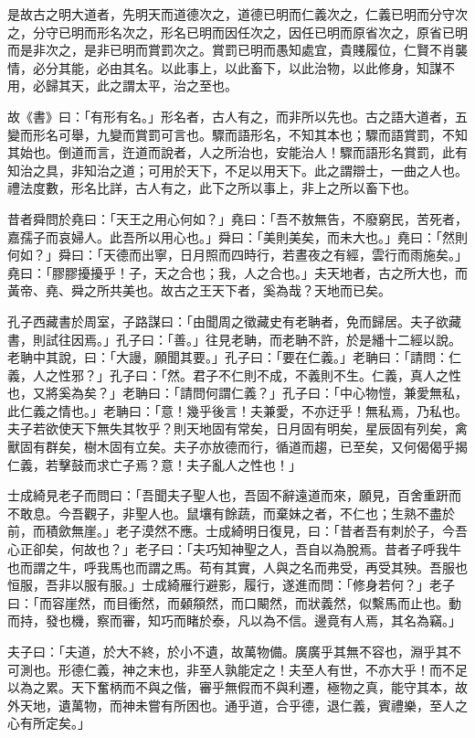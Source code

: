 \begin{pinyinscope}
是故古之明大道者，先明天而道德次之，道德已明而仁義次之，仁義已明而分守次之，分守已明而形名次之，形名已明而因任次之，因任已明而原省次之，原省已明而是非次之，是非已明而賞罰次之。賞罰已明而愚知處宜，貴賤履位，仁賢不肖襲情，必分其能，必由其名。以此事上，以此畜下，以此治物，以此修身，知謀不用，必歸其天，此之謂太平，治之至也。

故《書》曰：「有形有名。」形名者，古人有之，而非所以先也。古之語大道者，五變而形名可舉，九變而賞罰可言也。驟而語形名，不知其本也；驟而語賞罰，不知其始也。倒道而言，迕道而說者，人之所治也，安能治人！驟而語形名賞罰，此有知治之具，非知治之道；可用於天下，不足以用天下。此之謂辯士，一曲之人也。禮法度數，形名比詳，古人有之，此下之所以事上，非上之所以畜下也。

昔者舜問於堯曰：「天王之用心何如？」堯曰：「吾不敖無告，不廢窮民，苦死者，嘉孺子而哀婦人。此吾所以用心也。」舜曰：「美則美矣，而未大也。」堯曰：「然則何如？」舜曰：「天德而出寧，日月照而四時行，若晝夜之有經，雲行而雨施矣。」堯曰：「膠膠擾擾乎！子，天之合也；我，人之合也。」夫天地者，古之所大也，而黃帝、堯、舜之所共美也。故古之王天下者，奚為哉？天地而已矣。

孔子西藏書於周室，子路謀曰：「由聞周之徵藏史有老聃者，免而歸居。夫子欲藏書，則試往因焉。」孔子曰：「善。」往見老聃，而老聃不許，於是繙十二經以說。老聃中其說，曰：「大謾，願聞其要。」孔子曰：「要在仁義。」老聃曰：「請問：仁義，人之性邪？」孔子曰：「然。君子不仁則不成，不義則不生。仁義，真人之性也，又將奚為矣？」老聃曰：「請問何謂仁義？」孔子曰：「中心物愷，兼愛無私，此仁義之情也。」老聃曰：「意！幾乎後言！夫兼愛，不亦迂乎！無私焉，乃私也。夫子若欲使天下無失其牧乎？則天地固有常矣，日月固有明矣，星辰固有列矣，禽獸固有群矣，樹木固有立矣。夫子亦放德而行，循道而趨，已至矣，又何偈偈乎揭仁義，若擊鼓而求亡子焉？意！夫子亂人之性也！」

士成綺見老子而問曰：「吾聞夫子聖人也，吾固不辭遠道而來，願見，百舍重趼而不敢息。今吾觀子，非聖人也。鼠壤有餘蔬，而棄妹之者，不仁也；生熟不盡於前，而積歛無崖。」老子漠然不應。士成綺明日復見，曰：「昔者吾有刺於子，今吾心正卻矣，何故也？」老子曰：「夫巧知神聖之人，吾自以為脫焉。昔者子呼我牛也而謂之牛，呼我馬也而謂之馬。苟有其實，人與之名而弗受，再受其殃。吾服也恒服，吾非以服有服。」士成綺雁行避影，履行，遂進而問：「修身若何？」老子曰：「而容崖然，而目衝然，而顙頯然，而口闞然，而狀義然，似繫馬而止也。動而持，發也機，察而審，知巧而睹於泰，凡以為不信。邊竟有人焉，其名為竊。」

夫子曰：「夫道，於大不終，於小不遺，故萬物備。廣廣乎其無不容也，淵乎其不可測也。形德仁義，神之末也，非至人孰能定之！夫至人有世，不亦大乎！而不足以為之累。天下奮柄而不與之偕，審乎無假而不與利遷，極物之真，能守其本，故外天地，遺萬物，而神未嘗有所困也。通乎道，合乎德，退仁義，賓禮樂，至人之心有所定矣。」


\end{pinyinscope}
